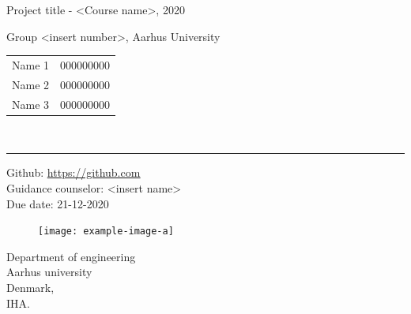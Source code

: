 \begin{titlepage}
   \begin{center}
       \vspace*{1cm}
       {\huge Project title - <Course name>, 2020}

       \vspace{0.5cm}
            

       	{\large Group <insert number>, Aarhus University} \\[1em]
    	\begin{tabular}{lr}
    		Name 1 & 000000000 \\
    		Name 2 & 000000000 \\
    		Name 3 & 000000000\\
    	\end{tabular}\\ 
    	
    	\vspace{0.8cm}
        \noindent\rule{4cm}{0.4pt}
    	\vspace{0.8cm}
    	
         Github: \color{blue}\underline{{\url{https://github.com}}}\color{black}\\
        
        \hfill \break
        Guidance counselor: <insert name>\\ 
        Due date: 21-12-2020 
        \vspace{0.8cm}  
        
        \begin{figure}[H]
            \centering
            \texttt{[image: example-image-a]}
        \end{figure}
      
        \vfill
            
            
     
           
       Department of engineering\\
       Aarhus university\\
       Denmark,\\
       IHA.
            
   \end{center}
\end{titlepage}
